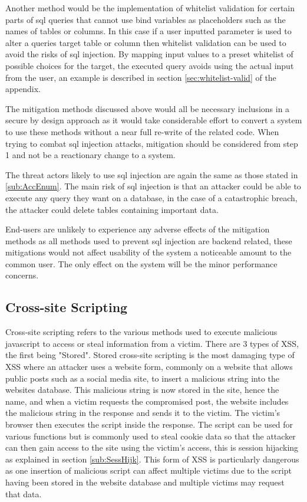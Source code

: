 \documentclass{ueacmpstyle}
\begin{document}
      Another method would be the implementation of whitelist validation for certain 
      parts of sql queries that cannot use bind variables as placeholders such as the 
      names of tables or columns. In this case if a user inputted parameter is used to 
      alter a queries target table or column then whitelist validation can be used to 
      avoid the risks of sql injection. By mapping input values to a preset whitelist 
      of possible choices for the target, the executed query avoids using the actual 
      input from the user, an example is described in section \ref{sec:whitelist-valid} 
      of the appendix.

      The mitigation methods discussed above would all be necessary inclusions in a 
      secure by design approach as it would take considerable effort to convert a system 
      to use these methods without a near full re-write of the related code. When trying 
      to combat sql injection attacks, mitigation should be considered from step 1 and not 
      be a reactionary change to a system.

      The threat actors likely to use sql injection are again the same as those stated 
      in \ref{sub:AccEnum}. The main risk of sql injection is that an attacker could be 
      able to execute any query they want on a database, in the case of a catastrophic 
      breach, the attacker could delete tables containing important data.

      End-users are unlikely to experience any adverse effects of the mitigation methods 
      as all methods used to prevent sql injection are backend related, these mitigations 
      would not affect usability of the system a noticeable amount to the common user. 
      The only effect on the system will be the minor performance concerns.

      \subsection{Cross-site Scripting}\label{sub:XSS}
      Cross-site scripting refers to the various methods used to execute malicious 
      javascript to access or steal information from a victim. There are 3 types of XSS, 
      the first being "Stored". Stored cross-site scripting is the most damaging type of 
      XSS where an attacker uses a website form, commonly on a website that allows public 
      posts such as a social media site, to insert a malicious string into the websites 
      database. This malicious string is now stored in the site, hence the name, and when 
      a victim requests the compromised post, the website includes the malicious string in 
      the response and sends it to the victim. The victim's browser then executes the script 
      inside the response. The script can be used for various functions but is commonly used 
      to steal cookie data so that the attacker can then gain access to the site using the 
      victim's access, this is session hijacking as explained in section \ref{sub:SessHijk}. 
      This form of XSS is particularly dangerous as one insertion of malicious script can 
      affect multiple victims due to the script having been stored in the website database 
      and multiple victims may request that data.
\end{document}
